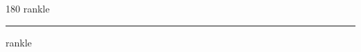 
\begin{frame}
\begin{center}
\begin{turn}{180}
{\fontsize{2.5cm}{1em}\selectfont rankle}
\end{turn}
\vspace{1em}\par  
\hrule
\vspace{1em}\par  
{\fontsize{2.5cm}{1em}\selectfont rankle}
\end{center}
\end{frame}
